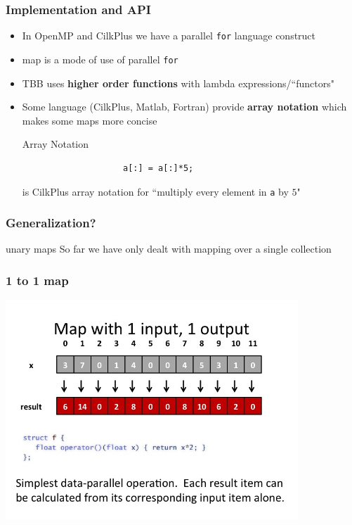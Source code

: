 \documentclass[xcolor=dvipsnames]{beamer}
\begin{document}
		\begin{frame}[fragile] \frametitle{Implementation and API}
			\begin{itemize}
				\item In OpenMP and CilkPlus we have a parallel \texttt{for} 
				language construct
				\item map is a mode of use of parallel \texttt{for}
				\item TBB uses \textbf{higher order functions} with lambda
				expressions/``functors"
				\item Some language (CilkPlus, Matlab, Fortran) provide
				\textbf{array notation} which makes some maps more concise\\
				\begin{exampleblock}{Array Notation}
					\begin{verbatim}
					a[:] = a[:]*5;
					\end{verbatim}
					is CilkPlus array notation for ``multiply every element in 
	                \texttt{a} by $5$" 
				\end{exampleblock}
			\end{itemize}
		\end{frame}
			
		\begin{frame} \frametitle{Generalization?}
			\begin{block}{unary maps}
				So far we have only dealt with mapping over a single collection
			\end{block}
		\end{frame}
			
		\begin{frame} \frametitle{1 to 1 map}
			\includegraphics[width=110mm]{images/map1to1.jpg}
		\end{frame}  
			
\end{document}
